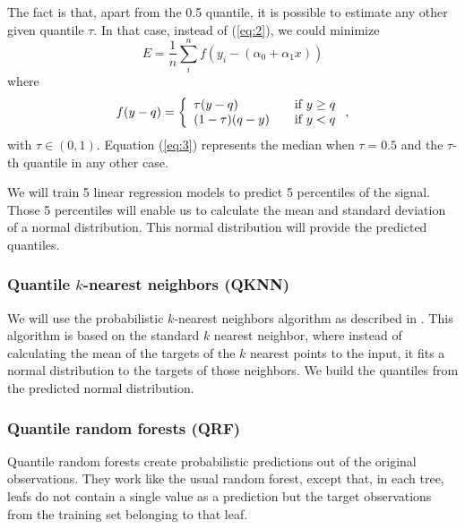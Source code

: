 \documentclass[a4paper,3p,sort&compress]{elsarticle}
\begin{document}
The fact is that, apart from the 0.5 quantile, it is possible to
estimate any other given quantile $\tau$. In that case, instead of
(\ref{eq:2}), we could minimize
\begin{equation}
  \label{eq:3}
  E= \frac{1}{n} \sum^n_i f( y_i - (\alpha_0 + \alpha_1 x))
\end{equation}
where
\begin{equation}
  \label{eq:4}
  f(y-q) = \left\{ 
    \begin{array}{l l}
      \tau (y-q) & \quad \mbox{if $y \ge q$}\\
      (1-\tau) (q-y) & \quad \mbox{if $y < q$}\\
    \end{array} \right.,
\end{equation}
with $\tau \in (0,1)$. Equation (\ref{eq:3}) represents the median
when $\tau=0.5$ and the $\tau$-th quantile in any other case.

We will train 5 linear regression models to predict 5 percentiles of
the signal. Those 5 percentiles will enable us to calculate the mean 
and standard deviation of a normal distribution. This normal distribution
will provide the predicted quantiles.

\subsubsection{Quantile $k$-nearest neighbors (QKNN)}

We will use the probabilistic $k$-nearest neighbors algorithm as
described in \cite{quantileknnmangalova}.  This algorithm is based on
the standard $k$ nearest neighbor, where instead of calculating the
mean of the targets of the $k$ nearest points to the input, it fits 
a normal distribution to the targets of those neighbors. 
We build the quantiles from the predicted normal distribution.

\subsubsection{Quantile random forests (QRF)}

Quantile random forests create probabilistic predictions out of the
original observations. They work like the usual random forest, except
that, in each tree, leafs do not contain a single value as a
prediction but the target observations from the training set belonging
to that
leaf.
\end{document}
